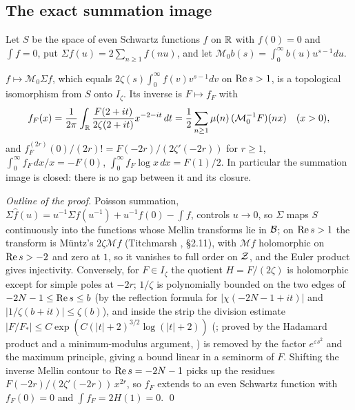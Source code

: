 \subsection{The exact summation image}

Let $S$ be the space of even Schwartz functions $f$ on $\mathbb{R}$ with $f(0)=0$ and $\int f=0$, put $\Sigma f(u)=2\sum_{n\ge1}f(nu)$, and let $\mathcal{M}_0b(s)=\int_0^\infty b(u)u^{s-1}du$.

\begin{proposition}\label{prop:summation-image}
$f\mapsto\mathcal{M}_0\Sigma f$, which equals $2\zeta(s)\int_0^\infty f(v)v^{s-1}dv$ on $\operatorname{Re} s>1$, is a topological isomorphism from $S$ onto $I_\zeta$. Its inverse is $F\mapsto f_F$ with
\[
f_F(x)=\frac1{2\pi}\int_{\mathbb{R}}\frac{F(2+it)}{2\zeta(2+it)}x^{-2-it}\,dt=\frac12\sum_{n\ge1}\mu(n)\,(\mathcal{M}_0^{-1}F)(nx)\quad(x>0),
\]
and $f_F^{(2r)}(0)/(2r)!=F(-2r)/(2\zeta'(-2r))$ for $r\ge1$, $\int_0^\infty f_F\,dx/x=-F(0)$, $\int_0^\infty f_F\log x\,dx=F(1)/2$.
In particular the summation image is closed: there is no gap between it and its closure.
\end{proposition}

\emph{Outline of the proof.}
Poisson summation, $\Sigma\hat f(u)=u^{-1}\Sigma f(u^{-1})+u^{-1}f(0)-\int f$, controls $u\to0$, so $\Sigma$ maps $S$ continuously into the functions whose Mellin transforms lie in $\mathcal{B}$; on $\operatorname{Re} s>1$ the transform is Müntz's $2\zeta\mathcal{M}f$ (Titchmarsh \cite{Titchmarsh}, §2.11), with $\mathcal{M}f$ holomorphic on $\operatorname{Re} s>-2$ and zero at $1$, so it vanishes to full order on $\mathcal{Z}$, and the Euler product gives injectivity.
Conversely, for $F\in I_\zeta$ the quotient $H=F/(2\zeta)$ is holomorphic except for simple poles at $-2r$; $1/\zeta$ is polynomially bounded on the two edges of $-2N-1\le\operatorname{Re} s\le b$ (by the reflection formula for $|\chi(-2N-1+it)|$ and $|1/\zeta(b+it)|\le\zeta(b)$), and inside the strip the division estimate $|F/F_*|\le C\exp(C(|t|+2)^{3/2}\log(|t|+2))$ (; proved by the Hadamard product and a minimum-modulus argument, ) is removed by the factor $e^{\varepsilon s^2}$ and the maximum principle, giving a bound linear in a seminorm of $F$.
Shifting the inverse Mellin contour to $\operatorname{Re} s=-2N-1$ picks up the residues $F(-2r)/(2\zeta'(-2r))\,x^{2r}$, so $f_F$ extends to an even Schwartz function with $f_F(0)=0$ and $\int f_F=2H(1)=0$. \qed

